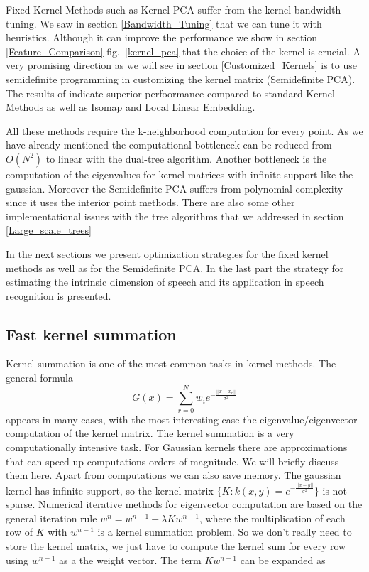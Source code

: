 \documentclass[12pt,letterpaper,doublespaced,ETD,dvips,proposal]{gtthesis}
\begin{document}
\begin{Body}
Fixed Kernel Methods such as Kernel PCA suffer from the kernel bandwidth tuning. 
We saw in section \ref{Bandwidth_Tuning}
that we can tune it with heuristics. Although it can improve the performance we show in 
section \ref{Feature_Comparison} fig.~\ref{kernel_pca} that the 
choice of the kernel is crucial. A very promising direction as we will see in 
section \ref{Customized_Kernels}
is to use semidefinite programming in customizing the kernel matrix (Semidefinite PCA). The results of \cite{weinberger2004lkm}
indicate superior perfoormance compared to standard Kernel Methods as well as Isomap and Local Linear Embedding.

All these methods require the k-neighborhood computation for every point. As we have already 
mentioned the computational bottleneck can be reduced from $O(N^2)$ to linear with the dual-tree
algorithm. Another bottleneck is the computation of the eigenvalues for kernel matrices with
infinite support like the gaussian. Moreover the Semidefinite PCA suffers from polynomial complexity since it uses the interior
point methods. There are also some other implementational issues with the tree algorithms that we addressed
in section \ref{Large_scale_trees}

In the next sections we present optimization strategies for the fixed kernel methods as well as for the
Semidefinite PCA. In the last part the strategy for estimating the intrinsic dimension of speech and its
application in speech recognition is presented.


\subsection{Fast kernel summation} 
Kernel summation is one of the most common tasks in kernel methods. The general formula
\begin{equation}
\label{kernel_sum}
  G(x)=\sum_{r=0}^{N} w_i e^{-\frac{||x-x_r||}{\sigma^2}}
\end{equation}
appears in many cases, with the most interesting case the
eigenvalue/eigenvector computation of the kernel matrix. The kernel summation is a very
computationally intensive task. For Gaussian kernels there are
approximations that can speed up computations orders of magnitude.
We will briefly discuss them here. Apart from computations we can also
save memory. The gaussian kernel has infinite support, so the
kernel matrix $\{K : k(x,y)=e^{-\frac{||x-y||}{\sigma^2}} \}$ is not
sparse. Numerical iterative methods for eigenvector computation are
based on the general iteration rule $w^n=w^{n-1}+\lambda Kw^{n-1}$, where
the multiplication of each row of $K$ with $w^{n-1}$ is a kernel
summation problem. So we don't really need to store the kernel
matrix, we just have to compute the kernel sum for every row using
$w^{n-1}$ as a the weight vector. The term $Kw^{n-1}$ can be
expanded as


\end{Body}
\end{document}
